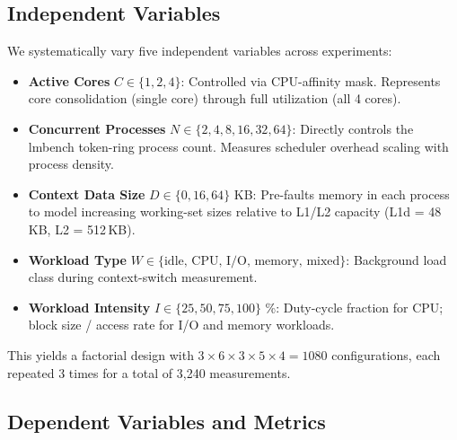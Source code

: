 \documentclass[conference]{IEEEtran}
\begin{document}
\subsection{Independent Variables}
\label{sec:variables}

We systematically vary five independent variables across experiments:

\begin{itemize}
  \item \textbf{Active Cores} $C \in \{1, 2, 4\}$:
        Controlled via CPU-affinity mask. Represents core consolidation (single
        core) through full utilization (all 4 cores).
  
  \item \textbf{Concurrent Processes} $N \in \{2, 4, 8, 16, 32, 64\}$:
        Directly controls the lmbench token-ring process count. Measures
        scheduler overhead scaling with process density.
  
  \item \textbf{Context Data Size} $D \in \{0, 16, 64\}$ KB:
        Pre-faults memory in each process to model increasing working-set
        sizes relative to L1/L2 capacity (L1d = 48\,KB, L2 = 512\,KB).
  
  \item \textbf{Workload Type} $W \in \{\text{idle, CPU, I/O, memory, mixed}\}$:
        Background load class during context-switch measurement.
  
  \item \textbf{Workload Intensity} $I \in \{25, 50, 75, 100\}$ \%:
        Duty-cycle fraction for CPU; block size / access rate for I/O and
        memory workloads.
\end{itemize}

This yields a factorial design with $3 \times 6 \times 3 \times 5 \times 4 = 1080$
configurations, each repeated 3 times for a total of 3,240 measurements.

\subsection{Dependent Variables and Metrics}
\end{document}
